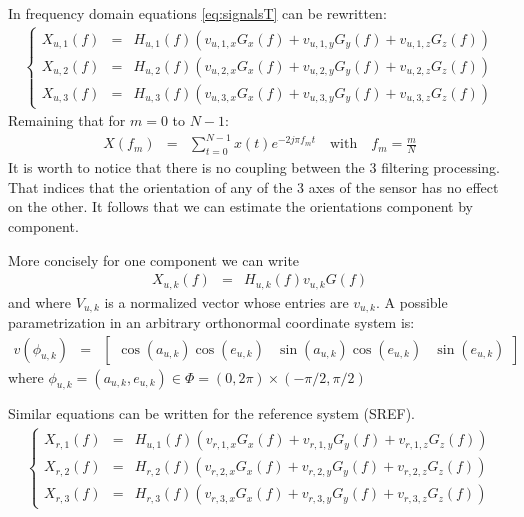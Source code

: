 \documentclass[a4paper, 12pt]{report}
\begin{document}
In frequency domain equations \eqref{eq:signalsT} can be rewritten:
\begin{eqnarray}
\label{eq:signalsF}
\left\{
\begin{array}{rcl}
X_{u,1}(f)&=&H_{u,1}(f) (v_{u,1,x}G_{x}(f)+v_{u,1,y}G_{y}(f)+v_{u,1,z}G_{z}(f))
\\
X_{u,2}(f)&=&H_{u,2}(f) (v_{u,2,x}G_{x}(f)+v_{u,2,y}G_{y}(f)+v_{u,2,z}G_{z}(f))
\\
X_{u,3}(f)&=&H_{u,3}(f) (v_{u,3,x}G_{x}(f)+v_{u,3,y}G_{y}(f)+v_{u,3,z}G_{z}(f))
\end{array}
\right.
\end{eqnarray}
Remaining that for $m=0$ to $N-1$:
\begin{eqnarray}
X(f_{m})&=&\sum_{t=0}^{N-1}x(t)e^{-2j\pi f_{m}t}\quad \mathrm{with}\quad f_{m}=\frac{m}{N} 
\end{eqnarray}
It is worth to notice that there is no coupling between the 3 filtering processing. That indices that the orientation of any of the 3 axes of the sensor has no effect on the other. It follows that we can estimate the orientations component by component.

More concisely for one component we can write
\begin{eqnarray*}
X_{u,k}(f)&=&H_{u,k}(f)v_{u,k}G(f)
\end{eqnarray*}
and where $V_{u,k}$ is a normalized vector whose entries are $v_{u,k}$.  A possible parametrization in an arbitrary orthonormal coordinate system is:
\begin{eqnarray}
\label{eq:parametricformofV}
v(\phi_{u,k})&=&
\begin{bmatrix}
\cos(a_{u,k})\cos(e_{u,k})&\sin(a_{u,k})\cos(e_{u,k})&\sin(e_{u,k})
\end{bmatrix}
\end{eqnarray}
where $\phi_{u,k}=(a_{u,k},e_{u,k})\in\Phi= (0,2\pi)\times (-\pi/2,\pi/2)$

 \bigskip
Similar equations can be written for the reference system (SREF). 
\begin{eqnarray}
\label{eq:signalsF}
\left\{
\begin{array}{rcl}
X_{r,1}(f)&=&H_{u,1}(f) (v_{r,1,x}G_{x}(f)+v_{r,1,y}G_{y}(f)+v_{r,1,z}G_{z}(f))
\\
X_{r,2}(f)&=&H_{r,2}(f) (v_{r,2,x}G_{x}(f)+v_{r,2,y}G_{y}(f)+v_{r,2,z}G_{z}(f))
\\
X_{r,3}(f)&=&H_{r,3}(f) (v_{r,3,x}G_{x}(f)+v_{r,3,y}G_{y}(f)+v_{r,3,z}G_{z}(f))
\end{array}
\right.
\end{eqnarray}
\end{document}

